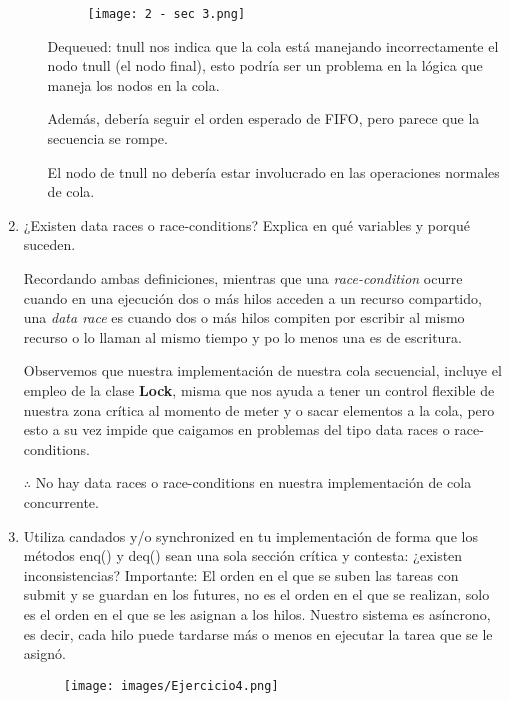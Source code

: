 \begin{enumerate}
\begin{itemize}
    \begin{figure}[h]
    \centering
    \texttt{[image: 2 - sec 3.png]}
\end{figure}
    Dequeued: tnull nos indica que la cola está manejando incorrectamente el nodo tnull (el nodo final), esto podría ser un problema en la lógica que maneja los nodos en la cola.

    Además, debería seguir el orden esperado de FIFO, pero parece que la secuencia se rompe.

    El nodo de tnull no debería estar involucrado en las operaciones normales de cola.
\end{itemize}

\hfill

\item ¿Existen data races o race-conditions? Explica en qué variables y porqué suceden.

Recordando ambas definiciones, mientras que una \textit{race-condition} ocurre cuando en una ejecución dos o más hilos acceden a un recurso compartido, una \textit{data race} es cuando dos o más hilos compiten por escribir al mismo recurso o lo llaman al mismo tiempo y po lo menos una es de escritura.

Observemos que nuestra implementación de nuestra cola secuencial, incluye el empleo de la clase \textbf{Lock}, misma que nos ayuda a tener un control flexible de nuestra zona crítica al momento de meter y o sacar elementos a la cola, pero esto a su vez impide que caigamos en problemas del tipo data races o race-conditions.

$\therefore$ No hay data races o race-conditions en nuestra implementación de cola concurrente.

\hfill

\item  Utiliza candados y/o synchronized en tu implementación de forma que los métodos enq() y deq() sean una sola sección crítica y contesta: ¿existen inconsistencias?
Importante: El orden en el que se suben las tareas con submit y se guardan en los futures, no es el orden en el que se realizan, solo es el orden en el que se les asignan a los hilos. Nuestro sistema es asíncrono, es decir, cada hilo puede tardarse más o menos en ejecutar la tarea que se le asignó.

\begin{figure}[h]
    \centering
    \texttt{[image: images/Ejercicio4.png]}
\end{figure}


\end{enumerate}
